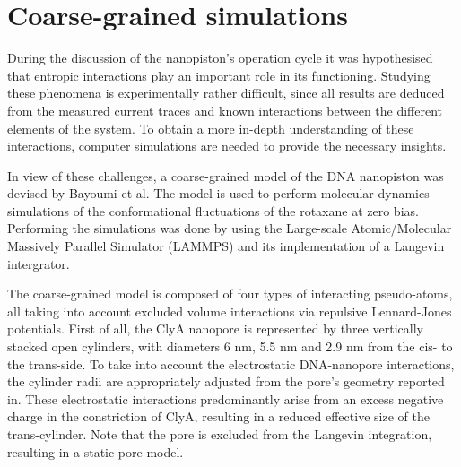 \section{Coarse-grained simulations}

During the discussion of the nanopiston's operation cycle it was hypothesised
that entropic interactions play an important role in its functioning. Studying these
phenomena is experimentally rather difficult, since all results are deduced from the
measured current traces and known interactions between the different elements of the
system. To obtain a more in-depth understanding of these interactions, computer
simulations are needed to provide the necessary insights.

In view of these challenges, a coarse-grained model of the DNA nanopiston was devised by
Bayoumi et al. The model is used to perform molecular dynamics simulations of  the
conformational fluctuations of the rotaxane at zero bias. Performing the simulations was
done by using the Large-scale Atomic/Molecular Massively Parallel Simulator (LAMMPS) and
its implementation of a Langevin intergrator. \cite{PLIMPTON19951}

The coarse-grained model is composed of four types of interacting pseudo-atoms, all
taking into account excluded volume interactions via repulsive Lennard-Jones
potentials. First of all, the ClyA nanopore is represented by three vertically stacked
open cylinders, with diameters 6 nm, 5.5 nm and 2.9 nm from the cis- to the trans-side.
To take into account the electrostatic DNA-nanopore interactions, the cylinder radii
are appropriately adjusted from the pore's geometry reported in. \cite{Franceschini2016}
These electrostatic interactions predominantly arise from an excess negative charge in
the constriction of ClyA, resulting in a reduced effective size of the trans-cylinder.
Note that the pore is excluded from the Langevin integration, resulting in a static pore
model.

